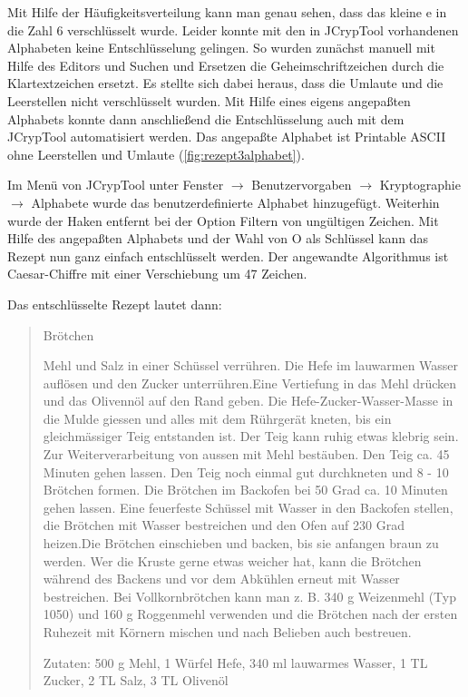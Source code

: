 
Mit Hilfe der Häufigkeitsverteilung kann man genau sehen, dass das kleine \glqq{}e\grqq{} 
in die Zahl \glqq{}6\grqq{} verschlüsselt wurde. Leider konnte mit den in JCrypTool
vorhandenen Alphabeten keine Entschlüsselung gelingen. So wurden zunächst
manuell mit Hilfe des Editors und Suchen und Ersetzen die Geheimschriftzeichen
durch die Klartextzeichen ersetzt. Es stellte sich dabei heraus, dass die
Umlaute und die Leerstellen nicht verschlüsselt wurden. Mit Hilfe eines eigens
angepaßten Alphabets konnte dann anschließend die Entschlüsselung auch mit dem
JCrypTool automatisiert werden. Das angepaßte Alphabet ist Printable ASCII ohne
Leerstellen und Umlaute (\cref{fig:rezept3alphabet}).


Im Menü von JCrypTool unter Fenster $\rightarrow$ Benutzervorgaben $\rightarrow$
Kryptographie $\rightarrow$ Alphabete wurde das benutzerdefinierte Alphabet
hinzugefügt. Weiterhin wurde der Haken entfernt bei der Option \glqq{}Filtern von
ungültigen Zeichen\grqq{}.  Mit Hilfe des angepaßten Alphabets und der Wahl von \glqq{}O\grqq{}
als Schlüssel kann das Rezept nun ganz einfach entschlüsselt werden.  Der
angewandte Algorithmus ist Caesar-Chiffre mit einer Verschiebung um 47 Zeichen.

Das entschlüsselte Rezept lautet dann:

\begin{quote}
 Brötchen

Mehl und Salz in einer Schüssel verrühren. Die Hefe im lauwarmen Wasser auflösen und den Zucker unterrühren.Eine Vertiefung in das Mehl drücken und das Olivennöl auf den Rand geben. Die Hefe-Zucker-Wasser-Masse in die Mulde giessen und alles mit dem Rührgerät kneten, bis ein gleichmässiger Teig entstanden ist. Der Teig kann ruhig etwas klebrig sein. Zur Weiterverarbeitung von aussen mit Mehl bestäuben. Den Teig ca. 45 Minuten gehen lassen. Den Teig noch einmal gut durchkneten und 8 - 10 Brötchen formen. Die Brötchen im Backofen bei 50 Grad ca. 10 Minuten gehen lassen. Eine feuerfeste Schüssel mit Wasser in den Backofen stellen, die Brötchen mit Wasser bestreichen und den Ofen auf 230 Grad heizen.Die Brötchen einschieben und backen, bis sie anfangen braun zu werden. Wer die Kruste gerne etwas weicher hat, kann die Brötchen während des Backens und vor dem Abkühlen erneut mit Wasser bestreichen. Bei Vollkornbrötchen kann man z. B. 340 g Weizenmehl (Typ 1050) und 160 g Roggenmehl verwenden und die Brötchen nach der ersten Ruhezeit mit Körnern mischen und nach Belieben auch bestreuen.

Zutaten: 500 g Mehl, 1 Würfel Hefe, 340 ml lauwarmes Wasser, 1 TL Zucker, 2 TL Salz, 3 TL Olivenöl 
\end{quote}
